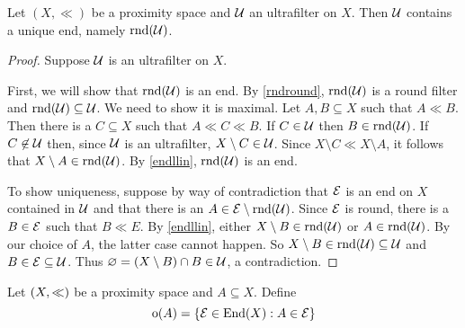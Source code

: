 \begin{theorem}
	Let \( (X,\ll) \) be a proximity space and \( \mathcal{U} \) an ultrafilter on \( X \).  Then \( \mathcal{U} \) contains a unique end, namely \( \operatorname{rnd}(\mathcal{U}) \).
\end{theorem}
\begin{proof}
	Suppose \( \mathcal{U} \) is an ultrafilter on \( X \).
	
	First, we will show that \( \operatorname{rnd}(\mathcal{U}) \) is an end.  By \ref{rndround}, \( \operatorname{rnd}(\mathcal{U}) \) is a round filter and \( \operatorname{rnd}(\mathcal{U}) \subseteq \mathcal{U} \).  We need to show it is maximal.  Let \( A,B \subseteq X \) such that \( A \ll B \).  Then there is a \( C \subseteq X \) such that \( A \ll C \ll B \).  If \( C \in \mathcal{U} \) then \( B \in \operatorname{rnd}(\mathcal{U}) \).  If \( C \not\in \mathcal{U} \) then, since \( \mathcal{U} \) is an ultrafilter, \( X \setminus C \in \mathcal{U} \).  Since \( X \setminus C \ll X \setminus A \), it follows that \( X \setminus A \in \operatorname{rnd}(\mathcal{U}) \).  By \ref{endllin}, \( \operatorname{rnd}(\mathcal{U}) \) is an end.
	
	To show uniqueness, suppose by way of contradiction that \( \mathcal{E} \) is an end on \( X \) contained in \( \mathcal{U} \) and that there is an \( A \in \mathcal{E} \setminus \operatorname{rnd}(\mathcal{U}) \).  Since \( \mathcal{E} \) is round, there is a \( B \in \mathcal{E} \) such that \( B \ll E \).  By \ref{endllin}, either \( X \setminus B \in \operatorname{rnd}(\mathcal{U}) \) or \( A \in \operatorname{rnd}(\mathcal{U}) \).  By our choice of \( A \), the latter case cannot happen.  So \( X \setminus B \in \operatorname{rnd}(\mathcal{U}) \subseteq \mathcal{U} \) and \( B \in \mathcal{E} \subseteq \mathcal{U} \).  Thus \( \varnothing = (X \setminus B) \cap B \in \mathcal{U} \), a contradiction.
\end{proof}

\begin{definition}
	Let \( (X,\mathord{\ll}) \) be a proximity space and \( A \subseteq X \).  Define
	\[ \operatorname{o}(A) = \{ \mathcal{E} \in \operatorname{End}(X): A \in \mathcal{E} \} \]
\end{definition}

